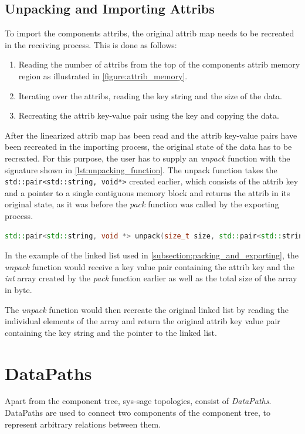 \subsection{Unpacking and Importing Attribs}
To import the components attribs, the original attrib map needs to be recreated in the receiving process. This is done as follows:

\begin{enumerate}
    \item Reading the number of attribs from the top of the components attrib memory region as illustrated in \autoref{figure:attrib_memory}.
    \item Iterating over the attribs, reading the key string and the size of the data.
    \item Recreating the attrib key-value pair using the key and copying the data.
\end{enumerate}

After the linearized attrib map has been read and the attrib key-value pairs have been recreated in the importing process, the original state of the data has to be recreated.
For this purpose, the user has to supply an \emph{unpack} function with the signature shown in \autoref{lst:unpacking_function}.
The unpack function takes the \lstinline|std::pair<std::string, void*>| created earlier, which consists of the attrib key and a pointer to a single contiguous memory block
and returns the attrib in its original state, as it was before the \emph{pack} function was called by the exporting process.

\begin{lstlisting}[language=c++, numbers=none, caption=Unpack Function Declaration, captionpos=b, breaklines=true, label={lst:unpacking_function}]
    std::pair<std::string, void *> unpack(size_t size, std::pair<std::string, void *> attrib);
\end{lstlisting}

In the example of the linked list used in \autoref{subsection:packing_and_exporting}, the \emph{unpack} function would receive a key value pair containing the attrib key
and the \emph{int} array created by the \emph{pack} function earlier as well as the total size of the array in byte.

The \emph{unpack} function would then recreate the original linked list by reading the individual elements of the array and return the original attrib key value pair containing
the key string and the pointer to the linked list.

\section{DataPaths}
Apart from the component tree, sys-sage topologies, consist of \emph{DataPaths}.
DataPaths are used to connect two components of the component tree, to represent arbitrary relations between them.

